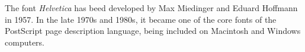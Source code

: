 The font \emph{Helvetica} has beed developed by Max Miedinger and Eduard Hoffmann in 1957.
In the late 1970s and 1980s, it became one of the core fonts of the PostScript page description language, being included on Macintosh and Windows computers.
